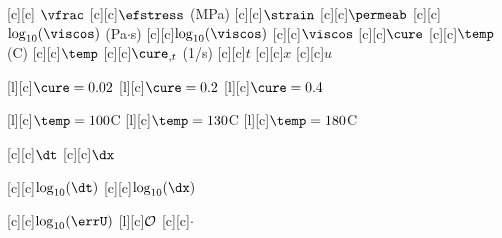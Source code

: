 [c][c] {$\vfrac$}
[c][c]{$\efstress$ (MPa)}
[c][c]{$\strain$}
[c][c]{$\permeab$}
[c][c]{$\log_{10}(\viscos)$ (Pa$\cdot$s)}
[c][c]{$\log_{10}(\viscos)$}
[c][c]{$\viscos$}
[c][c]{$\cure$}
[c][c]{$\temp$ (\degree C)}
[c][c]{$\temp$}
[c][c]{$\cure_{,t}$ (1/s)}
[c][c]{$t$}
[c][c]{$x$}
[c][c]{$u$}

[l][c]{\hspace{-1.5em}\small$\cure=0.02$}
[l][c]{\hspace{-1.5em}\small$\cure=0.2$}
[l][c]{\hspace{-1.5em}\small$\cure=0.4$}

[l][c]{\hspace{-2.2em}\small$\temp=100$\degree C}
[l][c]{\hspace{-2.2em}\small$\temp=130$\degree C}
[l][c]{\hspace{-2.2em}\small$\temp=180$\degree C}

[c][c]{$\dt$}
[c][c]{$\dx$}

[c][c]{$\log_{10}(\dt)$}
[c][c]{$\log_{10}(\dx)$}

[c][c]{$\log_{10}(\errU)$}
[l][c]{$\cal{O}$}
[c][c]{$\cdot$}
